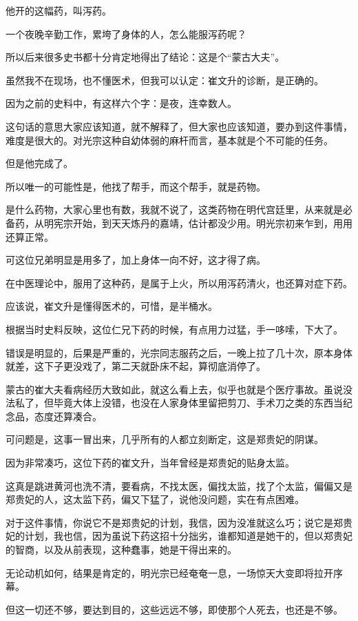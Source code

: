 \begin{multicols}{\theparacolNo}
他开的这幅药，叫泻药。

一个夜晚辛勤工作，累垮了身体的人，怎么能服泻药呢？

所以后来很多史书都十分肯定地得出了结论：这是个“蒙古大夫”。

虽然我不在现场，也不懂医术，但我可以认定：崔文升的诊断，是正确的。

因为之前的史料中，有这样六个字：是夜，连幸数人。

这句话的意思大家应该知道，就不解释了，但大家也应该知道，要办到这件事情，难度是很大的。对光宗这种自幼体弱的麻杆而言，基本就是个不可能的任务。

但是他完成了。

所以唯一的可能性是，他找了帮手，而这个帮手，就是药物。

是什么药物，大家心里也有数，我就不说了，这类药物在明代宫廷里，从来就是必备药，从明宪宗开始，到天天炼丹的嘉靖，估计都没少用。明光宗初来乍到，用用还算正常。

可这位兄弟明显是用多了，加上身体一向不好，这才得了病。

在中医理论中，服用了这种药，是属于上火，所以用泻药清火，也还算对症下药。

应该说，崔文升是懂得医术的，可惜，是半桶水。

根据当时史料反映，这位仁兄下药的时候，有点用力过猛，手一哆嗦，下大了。

错误是明显的，后果是严重的，光宗同志服药之后，一晚上拉了几十次，原本身体就差，这下子更没戏了，第二天就卧床不起，算彻底消停了。

蒙古的崔大夫看病经历大致如此，就这么看上去，似乎也就是个医疗事故。虽说没法私了，但毕竟大体上没错，也没在人家身体里留把剪刀、手术刀之类的东西当纪念品，态度还算凑合。

可问题是，这事一冒出来，几乎所有的人都立刻断定，这是郑贵妃的阴谋。

因为非常凑巧，这位下药的崔文升，当年曾经是郑贵妃的贴身太监。

这真是跳进黄河也洗不清，要看病，不找太医，偏找太监，找了个太监，偏偏又是郑贵妃的人，这太监下药，偏又下猛了，说他没问题，实在有点困难。

对于这件事情，你说它不是郑贵妃的计划，我信，因为没准就这么巧；说它是郑贵妃的计划，我也信，因为虽说下药这招十分拙劣，谁都知道是她干的，但以郑贵妃的智商，以及从前表现，这种蠢事，她是干得出来的。

无论动机如何，结果是肯定的，明光宗已经奄奄一息，一场惊天大变即将拉开序幕。

但这一切还不够，要达到目的，这些远远不够，即使那个人死去，也还是不够。


\end{multicols}
